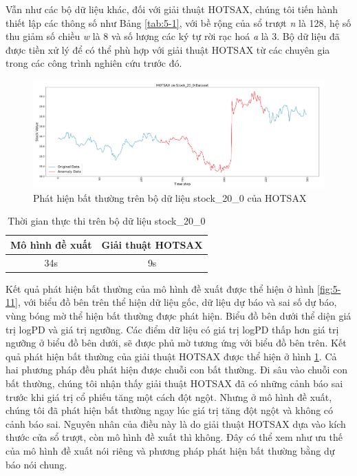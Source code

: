 Vẫn như các bộ dữ liệu khác, đối với giải thuật HOTSAX, chúng tôi tiến hành thiết lập các thông số như Bảng \ref{tab:5-1}, với bề rộng của sổ trượt \textit{n} là 128, hệ số thu giảm số chiều \textit{w} là 8 và số lượng các ký tự rời rạc hoá \textit{a} là 3. Bộ dữ liệu đã được tiền xử lý để có thể phù hợp với giải thuật HOTSAX từ các chuyên gia trong các công trình nghiên cứu trước đó.

\begin{figure}[H]
    \centering
    \includegraphics[scale=0.75]{./content/images/5-12.png}
    \caption{Phát hiện bất thường trên bộ dữ liệu stock\_20\_0 của HOTSAX}
    \label{fig:5-12}
\end{figure}

\begin{table}[H]
\centering
\begin{tabular}{|c|c|}
\hline
\textbf{Mô hình đề xuất} & \textbf{Giải thuật HOTSAX}  \\
\hline
34s                       & 9s                     \\
\hline
\end{tabular}
\caption{Thời gian thực thi trên bộ dữ liệu stock\_20\_0}
\label{tab:5-6}
\end{table}

Kết quả phát hiện bất thường của mô hình đề xuất được thể hiện ở hình \ref{fig:5-11}, với biểu đồ bên trên thể hiện dữ liệu gốc, dữ liệu dự báo và sai số dự báo, vùng bóng mờ thể hiện bất thường được phát hiện. Biểu đồ bên dưới thể diện giá trị logPD và giá trị ngưỡng. Các điểm dữ liệu có giá trị logPD thấp hơn giá trị ngưỡng ở biểu đồ bên dưới, sẽ được phủ mờ tương ứng với biểu đồ bên trên. Kết quả phát hiện bất thường của giải thuật HOTSAX được thể hiện ở hình \ref{fig:5-12}. Cả hai phương pháp đều phát hiện được chuỗi con bất thường. Đi sâu vào chuỗi con bất thường, chúng tôi nhận thấy giải thuật HOTSAX đã có những cảnh báo sai trước khi giá trị cổ phiếu tăng một cách đột ngột. Nhưng ở mô hình đề xuất, chúng tôi đã phát hiện bất thường ngay lúc giá trị tăng đột ngột và không có cảnh báo sai. Nguyên nhân của điều này là do giải thuật HOTSAX dựa vào kích thước cửa sổ trượt, còn mô hình đề xuất thì không. Đây có thể xem như ưu thế của mô hình đề xuất nói riêng và phương pháp phát hiện bất thường bằng dự báo nói chung.

